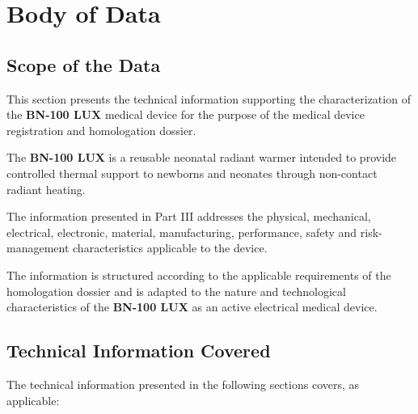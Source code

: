 ﻿

\hypertarget{p3-2}{}

\section{Body of Data}


\subsection{Scope of the Data}

This section presents the technical information supporting the
characterization of the \textbf{BN-100 LUX} medical device for the
purpose of the medical device registration and homologation dossier.

The \textbf{BN-100 LUX} is a reusable neonatal radiant warmer
intended to provide controlled thermal support to newborns and
neonates through non-contact radiant heating.

The information presented in Part III addresses the physical,
mechanical, electrical, electronic, material, manufacturing,
performance, safety and risk-management characteristics applicable
to the device.

The information is structured according to the applicable requirements
of the homologation dossier and is adapted to the nature and
technological characteristics of the \textbf{BN-100 LUX} as an active
electrical medical device.


\subsection{Technical Information Covered}

The technical information presented in the following sections covers,
as applicable:

